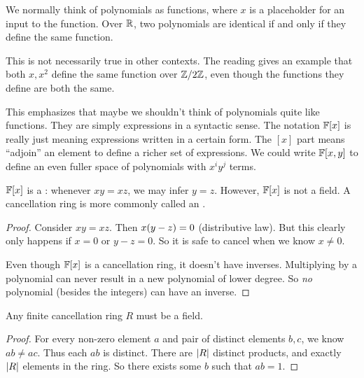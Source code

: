 \begin{remark}
  We normally think of polynomials as functions, where $x$ is a
  placeholder for an input to the function. Over $\mathbb{R}$, two polynomials
  are identical if and only if they define the same function.

  This is not necessarily true in other contexts. The reading gives an
  example that both $x, x^2$ define the same function over $\mathbb{Z} / 2\mathbb{Z}$,
  even though the functions they define are both the same.

  This emphasizes that maybe we shouldn't think of polynomials quite
  like functions. They are simply expressions in a syntactic sense. The
  notation $\mathbb{F}[x]$ is really just meaning expressions written in a
  certain form. The $[x]$ part means ``adjoin'' an element to define a
  richer set of expressions. We could write $\mathbb{F}[x, y]$ to define an
  even fuller space of polynomials with $x^i y^j$ terms.
\end{remark}

\begin{proposition}
  $\mathbb{F}[x]$ is a : whenever $xy = xz$, we may
  infer $y = z$. However, $\mathbb{F}[x]$ is not a field. A cancellation ring is
  more commonly called an .
\end{proposition}

\begin{proof}
  Consider $xy = xz$. Then $x \mathopen{}\left( {y - z} \right)\mathclose{} = 0$ (distributive law).
  But this clearly only happens if $x = 0$ or $y - z = 0$. So it is safe
  to cancel when we know $x \ne 0$.

  Even though $\mathbb{F}[x]$ is a cancellation ring, it doesn't have inverses.
  Multiplying by a polynomial can never result in a new polynomial of
  lower degree. So \emph{no} polynomial (besides the integers) can have
  an inverse.
\end{proof}

\begin{proposition}
  Any finite cancellation ring $R$ must be a field.
\end{proposition}

\begin{proof}
  For every non-zero element $a$ and pair of distinct elements $b, c$,
  we know $ab \ne ac$. Thus each $ab$ is distinct. There are $|R|$
  distinct products, and exactly $|R|$ elements in the ring. So
  there exists some $b$ such that $ab = 1$.
\end{proof}

